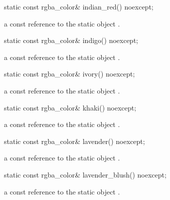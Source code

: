 \begin{itemdecl}
static const rgba_color& indian_red() noexcept;
\end{itemdecl}
\begin{itemdescr}
\pnum
\returns
a const reference to the static  object .
\end{itemdescr}

\begin{itemdecl}
static const rgba_color& indigo() noexcept;
\end{itemdecl}
\begin{itemdescr}
\pnum
\returns
a const reference to the static  object .
\end{itemdescr}

\begin{itemdecl}
static const rgba_color& ivory() noexcept;
\end{itemdecl}
\begin{itemdescr}
\pnum
\returns
a const reference to the static  object .
\end{itemdescr}

\begin{itemdecl}
static const rgba_color& khaki() noexcept;
\end{itemdecl}
\begin{itemdescr}
\pnum
\returns
a const reference to the static  object .
\end{itemdescr}

\begin{itemdecl}
static const rgba_color& lavender() noexcept;
\end{itemdecl}
\begin{itemdescr}
\pnum
\returns
a const reference to the static  object .
\end{itemdescr}

\begin{itemdecl}
static const rgba_color& lavender_blush() noexcept;
\end{itemdecl}
\begin{itemdescr}
\pnum
\returns
a const reference to the static  object .
\end{itemdescr}

